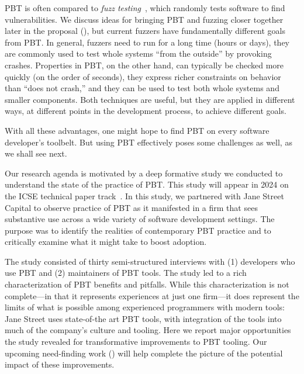 PBT is often compared to {\em fuzz testing}~\cite{afl-readme},
which randomly tests software to find
vulnerabilities. We discuss ideas for bringing PBT and
fuzzing closer together later in the proposal
(), but current fuzzers have fundamentally
different goals from PBT.  In general, fuzzers need to run for a long time (hours or
days), they are commonly used to test whole systems ``from the
outside'' by provoking
crashes. Properties in PBT, on the other hand, can typically be
checked more quickly (on the order of seconds), they express richer
constraints on behavior than ``does not crash,'' and they can be used
to test both whole systems and smaller components.  Both techniques are useful, but
they are applied in different ways, at different points in the
development process, to achieve different goals.

With all these advantages, one might hope to find PBT on every
software developer's toolbelt.  But using PBT effectively poses some
challenges as well, as we shall see next.

\iflater
{}  
\fi

\iflater{}\fi
%

Our research agenda is motivated by a deep formative study we conducted to
understand the state of the practice of PBT. This study will appear in 2024 on
the ICSE technical paper track~\cite{ref:goldstein2024property}.  In this
study, we partnered with Jane Street Capital to observe practice of PBT as it
manifested in a firm that sees substantive use across a wide variety of
software development settings.  The purpose was to identify the realities of
contemporary PBT practice and to critically examine what it might take to boost
adoption.

The study consisted of thirty semi-structured interviews with (1)
developers who use PBT and (2) maintainers of PBT tools. The study led to a
rich characterization of PBT benefits and pitfalls. While this characterization
is not complete---in that it represents experiences at just one firm---it does
represent the limits of what is possible among experienced programmers with
modern tools: Jane Street uses state-of-the art PBT tools, with integration of
the tools into much of the company's culture and tooling.  Here we report major opportunities the study revealed for transformative improvements to PBT tooling.  Our
upcoming need-finding work () will help complete the
picture of the potential impact of these improvements.

